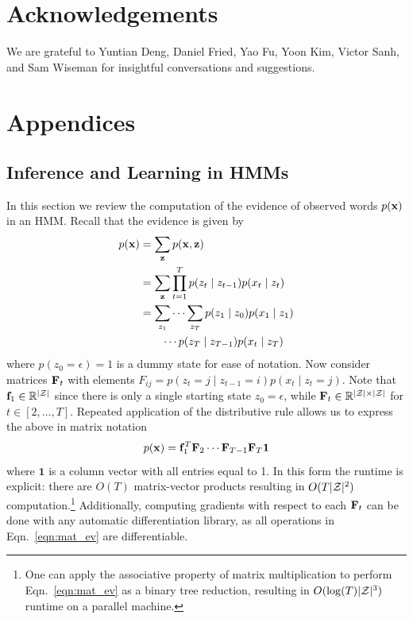 \documentclass[11pt,a4paper]{article}
\begin{document}
\section*{Acknowledgements}
We are grateful to
Yuntian Deng, Daniel Fried, Yao Fu, Yoon Kim, Victor Sanh, and Sam Wiseman
for insightful conversations and suggestions.




\appendix

\section{Appendices}
\subsection{Inference and Learning in HMMs}
In this section we review the computation of the evidence of observed words $p(\mathbf{x})$ in an HMM.
Recall that the evidence is given by
\begin{equation}
\begin{aligned}
p(\mathbf{x}) &= \sum_{\mathbf{z}} p(\mathbf{x}, \mathbf{z})\\
&= \sum_{\mathbf{z}} \prod_{t=1}^T p(z_t \mid z_{t-1})p(x_t \mid z_t) \\
&= \sum_{z_1} \cdots \sum_{z_T} p(z_1 \mid z_0)p(x_1 \mid z_1)\\
&\qquad \cdots p(z_T \mid z_{T-1})p(x_t \mid z_T)
\end{aligned}
\end{equation}
where $p(z_0=\epsilon)=1$ is a dummy state for ease of notation.
Now consider matrices $\mathbf{F}_t$ with
elements $F_{ij} = p(z_t = j \mid z_{t-1} = i) p(x_t \mid z_t = j)$.
Note that $\mathbf{f}_1 \in \mathbb{R}^{|\mathcal{Z}|}$ since there is only a single starting state $z_0 = \epsilon$,
while $\mathbf{F}_t \in \mathbb{R}^{|\mathcal{Z}|\times|\mathcal{Z}|}$ for $t \in [2, \ldots, T]$.
Repeated application of the distributive rule allows us to express the above in 
matrix notation
\begin{equation}
\label{eqn:sparse_mat_ev}
p(\mathbf{x}) = \mathbf{f}_1^T \mathbf{F}_2 \cdots \mathbf{F}_{T-1}\mathbf{F}_{T}\mathbf{1}
\end{equation}
where $\mathbf{1}$ is a column vector with all entries equal to 1.
In this form the runtime is explicit: there are $O(T)$ matrix-vector products
resulting in $O(T |\mathcal{Z}|^2)$ computation.\footnote{
One can apply the associative property of matrix multiplication
to perform Eqn.~\ref{eqn:mat_ev} as a binary tree reduction,
resulting in $O(\log(T)|\mathcal{Z}|^3)$ runtime on a parallel machine.
}
Additionally, computing gradients with respect to each $\mathbf{F}_t$ can be done with
any automatic differentiation library, as all operations in Eqn.~\ref{eqn:mat_ev} are differentiable.
\end{document}
